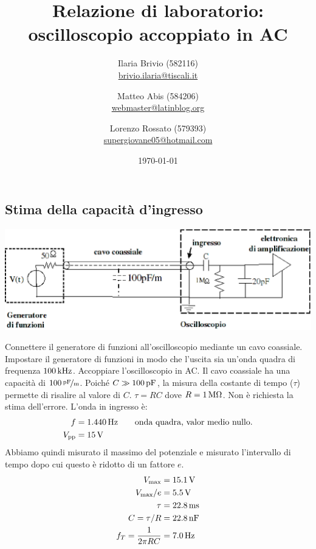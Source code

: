 \documentclass[italian,a4paper]{article}
\begin{document}
\title{Relazione di laboratorio: oscilloscopio accoppiato in AC}
\author{\normalsize Ilaria Brivio (582116)\\%
\normalsize \url{brivio.ilaria@tiscali.it}%
\and %
\normalsize Matteo Abis (584206)\\ %
\normalsize \url{webmaster@latinblog.org}
\and %
\normalsize Lorenzo Rossato (579393)\\ %
\normalsize \url{supergiovane05@hotmail.com}}
\date{\today}
\maketitle
\subsection*{Stima della capacità d'ingresso}
\begin{center}
 \includegraphics[height=9\baselineskip]{circuito2.eps}
\end{center}
Connettere il generatore di funzioni all’oscilloscopio mediante un cavo coassiale. Impostare il generatore di
funzioni in modo che l'uscita sia un'onda quadra di frequenza  $\unit[100]{kHz}$. Accoppiare l'oscilloscopio
in AC.
Il cavo coassiale ha una capacità di $\unitfrac[100]{pF}{m}$. Poiché $C\gg \unit[100]{pF}$, la misura della
costante di tempo ($\tau$) permette di risalire al valore di $C$. $\tau=RC$ dove $R=\unit[1]{M\ohm}$. Non è
richiesta la stima dell’errore.
L'onda in ingresso è:
\begin{align*}
    f&=\unit[1.440]{Hz} \qquad \text{onda quadra, valor medio nullo.}\\
    V_{\text{pp}}&=\unit[15]{V}\\
\end{align*}
Abbiamo quindi misurato il massimo del potenziale e misurato l'intervallo di
tempo dopo cui questo è ridotto di un fattore $e$.
\begin{align*}
    V_{\text{max}}&=\unit[15.1]{V}\\
    V_{\text{max}}/e&=\unit[5.5]{V}\\
    \tau&=\unit[22.8]{ms}\\
    C=\tau /R&=\unit[22.8]{nF}\\
    f_T=\frac{1}{2 \pi RC} &=\unit[7.0]{Hz}
\end{align*}
\end{document}
